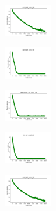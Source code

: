 \begin{figure}[H]
\begin{subfigure}
    \end{subfigure}
    \hfill
    \begin{subfigure}
        \centering
        \includegraphics[width=0.234\textwidth]{img/aggun/ecoli_set_const_20_589741062_cost.png}
    \end{subfigure}
    \hfill
    \begin{subfigure}
        \centering
        \includegraphics[width=0.234\textwidth]{img/aggun/rand_set_const_20_589741062_cost.png}
    \end{subfigure}
    \hfill
    \begin{subfigure}
        \centering
        \includegraphics[width=0.234\textwidth]{img/aggun/newthyroid_set_const_20_589741062_cost.png}
    \end{subfigure}
    \hfill
    \begin{subfigure}
        \centering
        \includegraphics[width=0.234\textwidth]{img/aggun/iris_set_const_20_277451237_cost.png}
    \end{subfigure}
    \hfill
    \begin{subfigure}
        \centering
        \includegraphics[width=0.234\textwidth]{img/aggun/ecoli_set_const_20_277451237_cost.png}
    \end{subfigure}
    \hfill

\end{figure}
